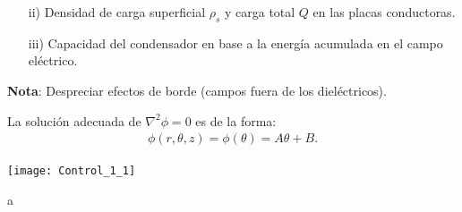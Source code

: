 \documentclass[
  11pt,
  letterpaper,
   addpoints,
  ]{exam}
\begin{document}
\begin{questions}
\begin{enumerate}
        \item[ii)] Densidad de carga superficial \( \rho_s \) y carga total \( Q \) en las placas conductoras.
    
        \item[iii)] Capacidad del condensador en base a la energía acumulada en el campo eléctrico.
     
    \end{enumerate}
    
    \noindent\textbf{Nota}: Despreciar efectos de borde (campos fuera de los dieléctricos).
    
    La solución adecuada de \( \nabla^2 \phi = 0 \) es de la forma:
    \begin{align}
    \phi(r,\theta,z) = \phi(\theta)= A\theta + B.
    \end{align}
    \begin{center}
        \texttt{[image: Control\_1\_1]}
    \end{center}
    \begin{solution}
       a
\end{solution}

\end{questions}
\end{document}
